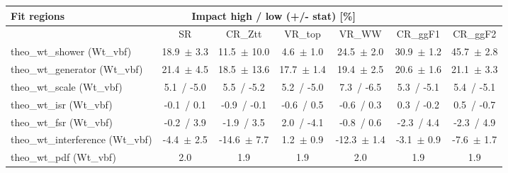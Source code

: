 \begin{tabular}{ l || c  c  c  c  c  c }
Fit regions & \multicolumn{4}{||c}{Impact high / low (+/- stat) [\%]} &  & \tabularnewline
\hline
 & SR & CR\_Ztt & VR\_top & VR\_WW & CR\_ggF1 & CR\_ggF2 \tabularnewline
\hline
theo\_wt\_shower (Wt\_vbf) & 18.9\, $\pm$  3.3 & 11.5\, $\pm$  10.0 & 4.6\, $\pm$  1.0 & 24.5\, $\pm$  2.0 & 30.9\, $\pm$  1.2 & 45.7\, $\pm$  2.8\tabularnewline
theo\_wt\_generator (Wt\_vbf) & 21.4\, $\pm$  4.5 & 18.5\, $\pm$  13.6 & 17.7\, $\pm$  1.4 & 19.4\, $\pm$  2.5 & 20.6\, $\pm$  1.6 & 21.1\, $\pm$  3.3\tabularnewline
theo\_wt\_scale (Wt\_vbf) & 5.1\, / -5.0 & 5.5\, / -5.2 & 5.2\, / -5.0 & 7.3\, / -6.5 & 5.3\, / -5.1 & 5.4\, / -5.1\tabularnewline
theo\_wt\_isr (Wt\_vbf) & -0.1\, / 0.1 & -0.9\, / -0.1 & -0.6\, / 0.5 & -0.6\, / 0.3 & 0.3\, / -0.2 & 0.5\, / -0.7\tabularnewline
theo\_wt\_fsr (Wt\_vbf) & -0.2\, / 3.9 & -1.9\, / 3.5 & 2.0\, / -4.1 & -0.8\, / 0.6 & -2.3\, / 4.4 & -2.3\, / 4.9\tabularnewline
theo\_wt\_interference (Wt\_vbf) & -4.4\, $\pm$  2.5 & -14.6\, $\pm$  7.7 & 1.2\, $\pm$  0.9 & -12.3\, $\pm$  1.4 & -3.1\, $\pm$  0.9 & -7.6\, $\pm$  1.7\tabularnewline
theo\_wt\_pdf (Wt\_vbf) & 2.0 & 1.9 & 1.9 & 2.0 & 1.9 & 1.9
\end{tabular}
